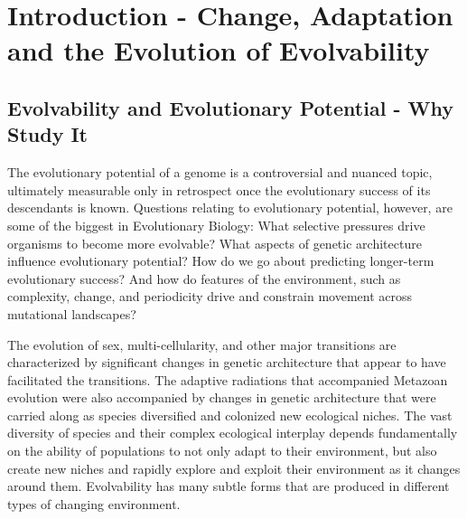 \documentclass[PhD]{msu-thesis}
\begin{document}
\chapter{Introduction - Change, Adaptation and the Evolution of Evolvability}
\label{chap:introduction}
\section{Evolvability and Evolutionary Potential - Why Study It} 
The evolutionary potential of a genome is a controversial and nuanced topic, ultimately measurable only in retrospect once the evolutionary success of its descendants is known. Questions relating to evolutionary potential, however, are some of the biggest in Evolutionary Biology: What selective pressures drive organisms to become more evolvable? What aspects of genetic architecture influence evolutionary potential? How do we go about predicting longer-term evolutionary success? And how do features of the environment, such as complexity, change, and periodicity drive and constrain movement across mutational landscapes?

The evolution of sex, multi-cellularity, and other major transitions are characterized by significant changes in genetic architecture that appear to have facilitated the transitions\cite{smith_major_1995}. The adaptive radiations that accompanied Metazoan evolution were also accompanied by changes in genetic architecture that were carried along as species diversified and colonized new ecological niches\cite{kirschner_evolvability_1998}. %
The vast diversity of species and their complex ecological interplay depends fundamentally on the ability of populations to not only adapt to their environment, but also create new niches and rapidly explore and exploit their environment as it changes around them. 
Evolvability has many subtle forms that are produced in different types of changing environment.
\end{document}
